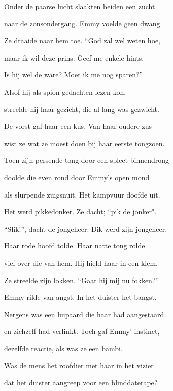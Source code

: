 Onder de paarse lucht
slaakten beiden een zucht

naar de zonsondergang.
Emmy voelde geen dwang.

Ze draaide naar hem toe.
“God zal wel weten hoe,

maar ik wil deze prins.
Geef me enkele hints.

Is hij wel de ware?
Moet ik me nog sparen?”

Alsof hij als spion
gedachten lezen kon,

streelde hij haar gezicht,
die al lang was gezwicht.

De vorst gaf haar een kus.
Van haar oudere zus

wist ze wat ze moest doen
bij haar eerste tongzoen.

Toen zijn persende tong
door een spleet binnendrong

doolde die even rond
door Emmy’s open mond

als slurpende zuigsnuit.
Het kampvuur doofde uit.

Het werd pikkedonker.
Ze dacht; “pik de jonker".

“Slik!”, dacht de jongeheer.
Dik werd zijn jongeheer.

Haar rode hoofd tolde.
Haar natte tong rolde

vief over die van hem.
Hij hield haar in een klem.

Ze streelde zijn lokken.
“Gaat hij mij nu fokken?”

Emmy rilde van angst.
In het duister het bangst.

Nergens was een luipaard
die haar had aangestaard

en zichzelf had verlinkt.
Toch gaf Emmy’ instinct,

dezelfde reactie,
als was ze een bambi.

Was de mens het roofdier
met haar in het vizier

dat het duister aangreep
voor een blinddaterape?
